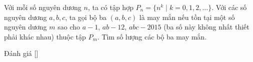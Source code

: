 \ifshowproblem
\begin{problem}\label{problem:CHN-2015-SEMO-10-P4}
    Với mỗi số nguyên dương $n$, ta có tập hợp $P_n = \{ n^k \mid k = 0,1,2, \ldots \}$.
    Với các số nguyên dương $a, b, c$, ta gọi bộ ba $(a, b, c)$ là may mắn nếu tồn tại một số nguyên dương $m$
    sao cho $a - 1$, $ab - 12$, $abc - 2015$ (ba số này không nhất thiết phải khác nhau) thuộc tập $P_m$. Tìm số lượng các bộ ba may mắn.
\end{problem}
\fi

\ifshowinfo
Đánh giá [\textbf{}]\footnotemark
{}
\fi